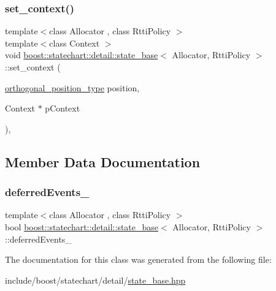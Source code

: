 \subsubsection{\texorpdfstring{set\+\_\+context()}{set\_context()}}
{\footnotesize\ttfamily template$<$class Allocator , class Rtti\+Policy $>$ \\
template$<$class Context $>$ \\
void \mbox{\hyperlink{classboost_1_1statechart_1_1detail_1_1state__base}{boost\+::statechart\+::detail\+::state\+\_\+base}}$<$ Allocator, Rtti\+Policy $>$\+::set\+\_\+context (\begin{DoxyParamCaption}\item[{\mbox{\hyperlink{namespaceboost_1_1statechart_1_1detail_a3bedea0b807a16fa222733417183d2c9}{orthogonal\+\_\+position\+\_\+type}}}]{position,  }\item[{Context $\ast$}]{p\+Context }\end{DoxyParamCaption})\hspace{0.3cm}{\ttfamily [inline]}, {\ttfamily [protected]}}



\subsection{Member Data Documentation}
\mbox{\label{classboost_1_1statechart_1_1detail_1_1state__base_af5db61d410c3ee39052fbad78c3d9d6e}} 
\subsubsection{\texorpdfstring{deferred\+Events\+\_\+}{deferredEvents\_}}
{\footnotesize\ttfamily template$<$class Allocator , class Rtti\+Policy $>$ \\
bool \mbox{\hyperlink{classboost_1_1statechart_1_1detail_1_1state__base}{boost\+::statechart\+::detail\+::state\+\_\+base}}$<$ Allocator, Rtti\+Policy $>$\+::deferred\+Events\+\_\+\hspace{0.3cm}{\ttfamily [private]}}



The documentation for this class was generated from the following file\+:\begin{DoxyCompactItemize}
\item 
include/boost/statechart/detail/\mbox{\hyperlink{state__base_8hpp}{state\+\_\+base.\+hpp}}\end{DoxyCompactItemize}
